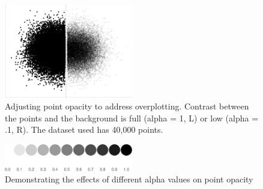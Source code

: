 \documentclass[manuscript, review, anonymous, screen]{acmart}
\begin{document}
\begin{figure}

\includegraphics[width=0.5\textwidth,height=\textheight]{size_and_opacity_files/figure-pdf/fig-overplotting-examples-1.pdf} \hfill{}

\caption{\label{fig-overplotting-examples}Adjusting point opacity to
address overplotting. Contrast between the points and the background is
full (alpha = 1, L) or low (alpha = .1, R). The dataset used has 40,000
points.}

\end{figure}

\begin{figure}

\includegraphics[width=0.5\textwidth,height=\textheight]{size_and_opacity_files/figure-pdf/fig-alpha-examples-1.pdf} \hfill{}

\caption{\label{fig-alpha-examples}Demonstrating the effects of
different alpha values on point opacity}

\end{figure}
\end{document}

